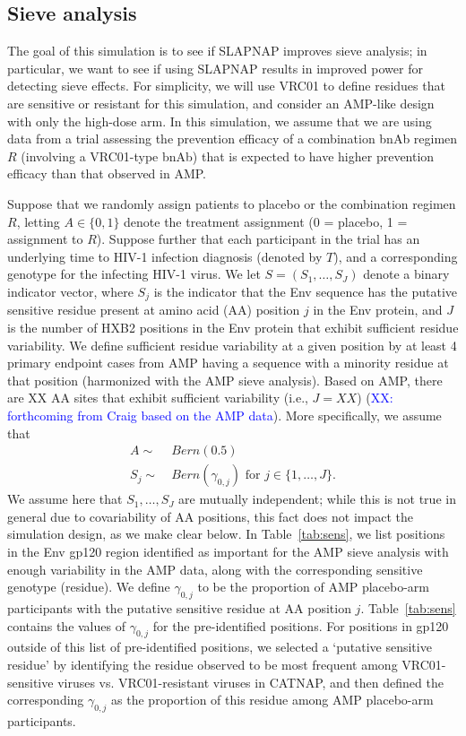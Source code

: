 \documentclass[10pt]{article}
\begin{document}
\subsection{Sieve analysis}

The goal of this simulation is to see if SLAPNAP improves sieve analysis; in particular, we want to see if using SLAPNAP results in improved power for detecting sieve effects. For simplicity, we will use VRC01 to define residues that are sensitive or resistant for this simulation, and consider an AMP-like design with only the high-dose arm. In this simulation, we assume that we are using data from a trial assessing the prevention efficacy of a combination bnAb regimen $R$ (involving a VRC01-type bnAb) that is expected to have higher prevention efficacy than that observed in AMP.

Suppose that we randomly assign patients to placebo or the combination regimen $R$, letting $A \in \{0,1\}$ denote the treatment assignment (0 = placebo, 1 = assignment to $R$). Suppose further that each participant in the trial has an underlying time to HIV-1 infection diagnosis (denoted by $T$), and a corresponding genotype for the infecting HIV-1 virus. We let $S = (S_1, \ldots, S_J)$ denote a binary indicator vector, where $S_j$ is the indicator that the Env sequence has the putative sensitive residue present at amino acid (AA) position $j$ in the Env protein, and $J$ is the number of HXB2 positions in the Env protein that exhibit sufficient residue variability. We define sufficient residue variability at a given position by at least 4 primary endpoint cases from AMP having a sequence with a minority residue at that position (harmonized with the AMP sieve analysis). Based on AMP, there are XX AA sites that exhibit sufficient variability (i.e., $J = XX$) (\textcolor{blue}{XX: forthcoming from Craig based on the AMP data}). More specifically, we assume that
\begin{align*}
  A \sim & \ Bern(0.5) \\
  S_j \sim & \ Bern(\gamma_{0,j}) \text{ for } j \in \{1, \ldots, J\}.
\end{align*}
We assume here that $S_1, \ldots, S_J$ are mutually independent; while this is not true in general due to covariability of AA positions, this fact does not impact the simulation design, as we make clear below. In Table~\ref{tab:sens}, we list positions in the Env gp120 region identified as important for the AMP sieve analysis with enough variability in the AMP data, along with the corresponding sensitive genotype (residue). We define $\gamma_{0,j}$ to be the proportion of AMP placebo-arm participants with the putative sensitive residue at AA position $j$. Table~\ref{tab:sens} contains the values of $\gamma_{0,j}$ for the pre-identified positions. For positions in gp120 outside of this list of pre-identified positions, we selected a `putative sensitive residue' by identifying the residue observed to be most frequent among VRC01-sensitive viruses vs. VRC01-resistant viruses in CATNAP, and then defined the corresponding $\gamma_{0,j}$ as the proportion of this residue among AMP placebo-arm participants.
\end{document}
